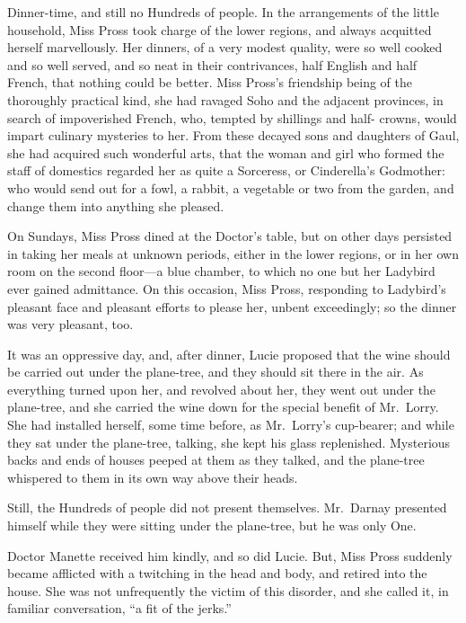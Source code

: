 Dinner-time, and still no Hundreds of people.  In the arrangements of
the little household, Miss Pross took charge of the lower regions,
and always acquitted herself marvellously.  Her dinners, of a very
modest quality, were so well cooked and so well served, and so neat
in their contrivances, half English and half French, that nothing
could be better.  Miss Pross's friendship being of the thoroughly
practical kind, she had ravaged Soho and the adjacent provinces, in
search of impoverished French, who, tempted by shillings and half-%
crowns, would impart culinary mysteries to her.  From these decayed
sons and daughters of Gaul, she had acquired such wonderful arts,
that the woman and girl who formed the staff of domestics regarded
her as quite a Sorceress, or Cinderella's Godmother:  who would send
out for a fowl, a rabbit, a vegetable or two from the garden, and
change them into anything she pleased.

On Sundays, Miss Pross dined at the Doctor's table, but on other days
persisted in taking her meals at unknown periods, either in the lower
regions, or in her own room on the second floor---a blue chamber,
to which no one but her Ladybird ever gained admittance.  On this
occasion, Miss Pross, responding to Ladybird's pleasant face and
pleasant efforts to please her, unbent exceedingly; so the dinner was
very pleasant, too.

It was an oppressive day, and, after dinner, Lucie proposed that the
wine should be carried out under the plane-tree, and they should sit
there in the air.  As everything turned upon her, and revolved about
her, they went out under the plane-tree, and she carried the wine
down for the special benefit of Mr.\ Lorry.  She had installed herself,
some time before, as Mr.\ Lorry's cup-bearer; and while they sat under
the plane-tree, talking, she kept his glass replenished.  Mysterious
backs and ends of houses peeped at them as they talked, and the
plane-tree whispered to them in its own way above their heads.

Still, the Hundreds of people did not present themselves.  Mr.\ Darnay
presented himself while they were sitting under the plane-tree,
but he was only One.

Doctor Manette received him kindly, and so did Lucie.  But, Miss
Pross suddenly became afflicted with a twitching in the head and
body, and retired into the house.  She was not unfrequently the
victim of this disorder, and she called it, in familiar conversation,
``a fit of the jerks.''

